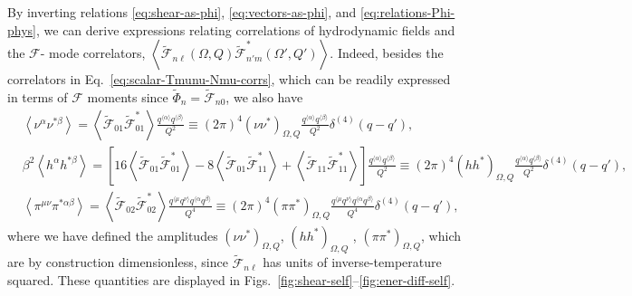 \documentclass[aps,prd,preprint,nofootinbib,amsmath,amssymb,showpacs,longbibliography,singlecolumn,superscriptaddress,10pt]{revtex4-1}
\theoremstyle{plain}
\theoremstyle{definition}
\begin{document}
By inverting relations \eqref{eq:shear-as-phi}, \eqref{eq:vectors-as-phi}, and \eqref{eq:relations-Phi-phys}, we can derive expressions relating correlations of hydrodynamic fields and the $\mathcal{F}$- mode correlators, $\left\langle \widetilde{\mathcal{F}}_{n\ell}(\Omega, Q)
 \widetilde{\mathcal{F}}^{*}_{n'm}(\Omega', Q')\right\rangle$. Indeed, besides the correlators in Eq.~\eqref{eq:scalar-Tmunu-Nmu-corrs}, which can be readily expressed in terms of $\mathcal{F}$ moments since $\widetilde{\Phi}_{n} = \widetilde{\mathcal{F}}_{n0}$, we also have
%
\begin{equation}
\begin{aligned}
 &  
\left\langle \nu^{\alpha}
\nu^{*\beta} \right\rangle
=
\left\langle \widetilde{\mathcal{F}}_{01} \widetilde{\mathcal{F}}_{01}^{*} \right\rangle \frac{q^{\langle \alpha \rangle}
q^{\langle \beta \rangle}}{Q^{2}}
\equiv
(2 \pi)^{4} 
\left( \nu
\nu^{*} \right)_{\Omega, Q}
\frac{q^{\langle \alpha \rangle}
q^{\langle \beta \rangle}}{Q^{2}}
\delta^{(4)}(q-q')
,
\quad
\\
&
\beta^{2}\left\langle h^{\alpha}
h^{*\beta} \right\rangle
=
\left[
16
\left\langle \widetilde{\mathcal{F}}_{01} \widetilde{\mathcal{F}}_{01}^{*} \right\rangle 
-
8
\left\langle \widetilde{\mathcal{F}}_{01} \widetilde{\mathcal{F}}_{11}^{*} \right\rangle
+
\left\langle \widetilde{\mathcal{F}}_{11} \widetilde{\mathcal{F}}_{11}^{*} \right\rangle
\right]
\frac{q^{\langle \alpha \rangle}
q^{\langle \beta \rangle}}{Q^{2}}
\equiv
(2 \pi)^{4}\left( h
h^{*} \right)_{\Omega, Q}
\frac{q^{\langle \alpha \rangle}
q^{\langle \beta \rangle}}{Q^{2}}
\delta^{(4)}(q-q')
,
\\
&
\left\langle \pi^{\mu \nu} \pi^{*\alpha\beta} \right\rangle
=
\left\langle \widetilde{\mathcal{F}}_{02} \widetilde{\mathcal{F}}_{02}^{*} \right\rangle 
\frac{q^{\langle \mu}q^{\nu \rangle}
q^{\langle \alpha}q^{\beta \rangle}}{Q^{4}}
\equiv
(2 \pi)^{4}
\left( \pi \pi^{*} \right)_{\Omega, Q}\frac{q^{\langle \mu}q^{\nu \rangle}
q^{\langle \alpha}q^{\beta \rangle}}{Q^{4}}
\delta^{(4)}(q-q')
,
\end{aligned}    
\end{equation}
%
where we have defined the amplitudes $\left( \nu \nu^{*} \right)_{\Omega, Q}$, $\left( h h^{*} \right)_{\Omega, Q}$ , $\left( \pi \pi^{*} \right)_{\Omega, Q}$, which are by construction dimensionless, since $\widetilde{\mathcal{F}}_{n \ell}$ has units of inverse-temperature squared. These quantities are displayed in Figs.~\ref{fig:shear-self}--\ref{fig:ener-diff-self}.
\end{document}
